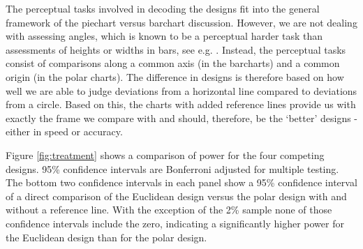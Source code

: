 The perceptual tasks involved in decoding the designs fit into the general framework of the piechart versus barchart discussion. However, we are not dealing with assessing angles, which is known to be a perceptual harder task than assessments of heights or widths in bars, see e.g. \cite{cleveland:1984, robbins:2004, Kosslyn:2006, few:2009}. Instead, the perceptual tasks consist of comparisons along a common axis (in the barcharts) and a common origin (in the polar charts). The difference in designs is therefore based on how well we are able to judge deviations from a horizontal line compared to deviations from a circle. Based on this, the charts with added reference lines provide us with exactly the frame we compare with and should, therefore, be the `better' designs - either in speed or accuracy.

Figure \ref{fig:treatment} shows a comparison of power for the four competing designs. 95\% confidence intervals are  Bonferroni adjusted for multiple testing. The bottom two confidence intervals in each panel show a 95\% confidence interval of a direct comparison of the Euclidean design versus the polar design with and without a reference line. With the exception of the 2\% sample none of those confidence intervals include the zero, indicating a significantly higher power for the Euclidean design than for the polar design.


